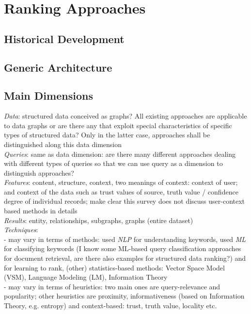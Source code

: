 \section{Ranking Approaches}

\subsection{Historical Development} 


\subsection{Generic Architecture} 


\subsection{Main Dimensions} 
\emph{Data}: structured data conceived as graphs? All existing approaches are applicable to data graphs or are there any that exploit special characteristics of specific types of structured data? Only in the latter case, approaches shall be distinguished along this data dimension\\

\emph{Queries}: same as data dimension: are there many different approaches dealing with different types of queries so that we can use query as a dimension to distinguish approaches?\\

\emph{Features}: content, structure, context, two meanings of context: context of user; and context of the data such as trust values of source, truth value / confidence degree of individual records; make clear this survey does not discuss user-context based methods in details\\

\emph{Results}: entity, relationships, subgraphs, graphs (entire dataset)\\

\emph{Techniques}:\\
- may vary in terms of methods: used \emph{NLP} for understanding keywords, used \emph{ML} for classifying keywords (I know some ML-based query classification approaches for document retrieval, are there also examples for structured data ranking?) and for learning to rank, (other) statistics-based methods: Vector Space Model (VSM), Language Modeling (LM), Information Theory\\
- may vary in terms of heuristics: two main ones are query-relevance and popularity; other heuristics are proximity, informativeness (based on Information Theory, e.g. entropy) and context-based: trust, truth value, locality etc. 


